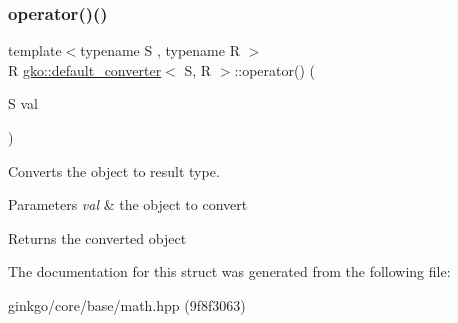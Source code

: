 \subsubsection{\texorpdfstring{operator()()}{operator()()}}
{\footnotesize\ttfamily template$<$typename S , typename R $>$ \\
R \hyperlink{structgko_1_1default__converter}{gko\+::default\+\_\+converter}$<$ S, R $>$\+::operator() (\begin{DoxyParamCaption}\item[{S}]{val }\end{DoxyParamCaption})}



Converts the object to result type. 


\begin{DoxyParams}{Parameters}
{\em val} & the object to convert \\
\hline
\end{DoxyParams}
\begin{DoxyReturn}{Returns}
the converted object 
\end{DoxyReturn}


The documentation for this struct was generated from the following file\+:\begin{DoxyCompactItemize}
\item 
ginkgo/core/base/math.\+hpp (9f8f3063)\end{DoxyCompactItemize}
